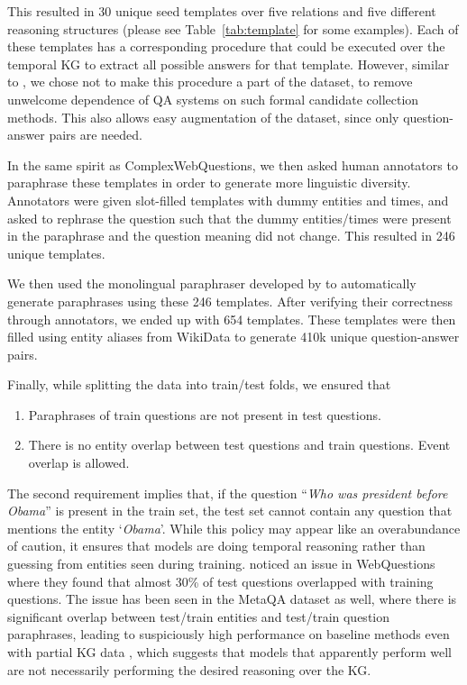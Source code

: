 \documentclass[11pt,a4paper]{article}
\begin{document}
This resulted in 30 unique seed templates over five relations and five different reasoning structures (please see Table~\ref{tab:template} for some examples). Each of these templates has a corresponding procedure that could be executed over the temporal KG to extract all possible answers for that template. However, similar to \citet{zhang2017variational}, we chose not to make this procedure a part of the dataset, to remove unwelcome dependence of QA systems on such formal candidate collection methods. This also allows easy augmentation of the dataset, since only question-answer pairs are needed.

In the same spirit as ComplexWebQuestions, we then asked human annotators to paraphrase these templates in order to generate more linguistic diversity. Annotators were given slot-filled templates with dummy entities and times, and asked to rephrase the question such that the dummy entities/times were present in the paraphrase and the question meaning did not change. This resulted in 246 unique templates.

We then used the monolingual paraphraser developed by \citet{N18-1007} to automatically generate paraphrases using these 246 templates. After verifying their correctness through annotators, we ended up with 654 templates. These templates were then filled using entity aliases from WikiData to generate 410k unique question-answer pairs. 

Finally, while splitting the data into train/test folds, we ensured that 
\begin{enumerate}
    \item Paraphrases of train questions are not present in test questions.
    \item There is no entity overlap between test questions and train questions. Event overlap is allowed.
\end{enumerate}
The second requirement implies that, if the question ``\textit{Who was president before Obama}'' is present in the train set, the test set cannot contain any question that mentions the entity `\textit{Obama}'.
While this policy may appear like an overabundance of caution, it ensures that models are doing temporal reasoning rather than guessing from entities seen during training. \citet{lewis2020question} noticed an issue in WebQuestions where they found that almost 30\% of test questions overlapped with training questions. The issue has been seen in the MetaQA dataset as well, where there is significant overlap between test/train entities and test/train question paraphrases, leading to suspiciously high performance on baseline methods even with partial KG data \citep{saxena-etal-2020-improving}, which suggests that models that apparently perform well are not necessarily performing the desired reasoning over the KG.
\end{document}
